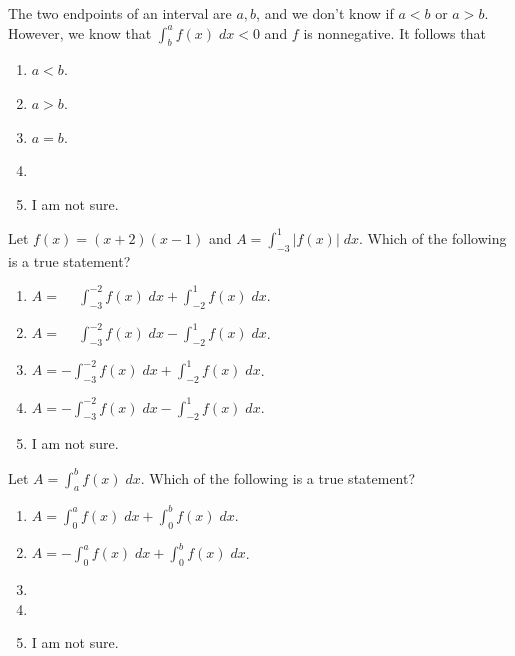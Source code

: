 \documentclass[14pt]{beamer}
\begin{document}
\begin{frame}[t]
  The two endpoints of an interval are \(a,b\), and we don't know if \(a < b\) or \(a > b\). However, we know that \(\int_{b}^{a} f(x) \;dx < 0\) and \(f\) is nonnegative. It follows that 

  \begin{enumerate} \setlength\itemsep{1ex}
    \item \(a < b\).
    \item \(a > b\).
    \item \(a = b\).
    \item 
    \item I am not sure.
  \end{enumerate} 
\end{frame}

\begin{frame}[t]
  Let \(f(x) = (x+2)(x-1)\) and \(A = \int_{-3}^{1} \big|f(x)\big| \;dx\).  Which of the following is a true statement?

  \begin{enumerate} \setlength\itemsep{1ex}
    \item \(A = \phantom{-}\int_{-3}^{-2} f(x) \;dx + \int_{-2}^{1} f(x) \;dx\).
    \item \(A = \phantom{-}\int_{-3}^{-2} f(x) \;dx - \int_{-2}^{1} f(x) \;dx\).
    \item \(A = -\int_{-3}^{-2} f(x) \;dx + \int_{-2}^{1} f(x) \;dx\).
    \item \(A = -\int_{-3}^{-2} f(x) \;dx - \int_{-2}^{1} f(x) \;dx\).
    \item I am not sure.
  \end{enumerate} 
\end{frame}

\begin{frame}[t]
  Let \(A = \int_{a}^{b} f(x) \;dx\). Which of the following is a true statement?

  \begin{enumerate} \setlength\itemsep{1ex}
    \item \(A = \int_{0}^{a} f(x) \;dx + \int_{0}^{b} f(x) \;dx\).
    \item \(A = -\int_{0}^{a} f(x) \;dx + \int_{0}^{b} f(x) \;dx\).
    \item 
    \item 
    \item I am not sure.
  \end{enumerate} 
\end{frame}
\end{document}
